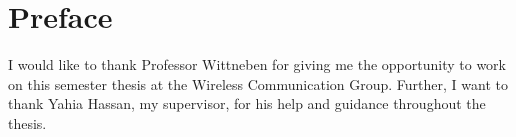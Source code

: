 \chapter*{Preface}

I would like to thank Professor Wittneben for giving me the opportunity to work on this semester thesis at the Wireless Communication Group.
Further, I want to thank Yahia Hassan, my supervisor, for his help and guidance throughout the thesis.

